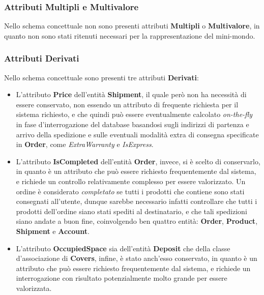 \subsubsection{Attributi Multipli e Multivalore}

Nello schema concettuale non sono presenti attributi \textbf{Multipli} o \textbf{Multivalore}, in quanto non sono stati ritenuti necessari per la rappresentazione del mini-mondo.

\subsubsection{Attributi Derivati}

Nello schema concettuale sono presenti tre attributi \textbf{Derivati}:

\begin{itemize}
  \item L'attributo \textbf{Price} dell'entità \textbf{Shipment}, il quale però non ha necessità di essere conservato, non essendo un attributo di frequente richiesta per il sistema richiesto, e che quindi può essere eventualmente calcolato \textit{on-the-fly} in fase d'interrogazione del database basandosi sugli indirizzi di partenza e arrivo della spedizione e sulle eventuali modalità extra di consegna specificate in \textbf{Order}, come \textit{ExtraWarranty} e \textit{IsExpress}.
  \item L'attributo \textbf{IsCompleted} dell'entità \textbf{Order}, invece, si è scelto di conservarlo, in quanto è un attributo che può essere richiesto frequentemente dal sistema, e richiede un controllo relativamente complesso per essere valorizzato. Un ordine è considerato \textit{completato} se tutti i prodotti che contiene sono stati consegnati all'utente, dunque sarebbe necessario infatti controllare che tutti i prodotti dell'ordine siano stati spediti al destinatario, e che tali spedizioni siano andate a buon fine, coinvolgendo ben quattro entità: \textbf{Order}, \textbf{Product}, \textbf{Shipment} e \textbf{Account}. %
  \item L'attributo \textbf{OccupiedSpace} sia dell'entità \textbf{Deposit} che della classe d'associazione di \textbf{Covers}, infine, è stato anch'esso conservato, in quanto è un attributo che può essere richiesto frequentemente dal sistema, e richiede un interrogazione con risultato potenzialmente molto grande per essere valorizzata. %
\end{itemize}


